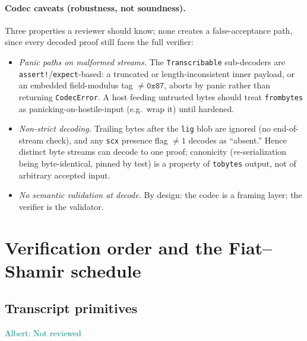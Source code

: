 \documentclass[11pt]{article}
\newcommand{\albert}[1]{\textcolor{teal}{Albert: {#1}}}
\newcommand{\code}[1]{{\def\_{\textunderscore\allowbreak}\texttt{#1}}}
\begin{document}
\paragraph{Codec caveats (robustness, not soundness).}  Three properties
a reviewer should know; none creates a false-acceptance path, since every
decoded proof still faces the full verifier:
\begin{itemize}[itemsep=1pt]
\item \emph{Panic paths on malformed streams.}  The \code{Transcribable}
  sub-decoders are \code{assert!}/\code{expect}-based: a truncated or
  length-inconsistent inner payload, or an embedded field-modulus tag
  $\ne \mathtt{0x87}$, aborts by panic rather than returning
  \code{CodecError}.  A host feeding untrusted bytes should treat
  \code{from\_bytes} as panicking-on-hostile-input (e.g.\ wrap it) until
  hardened.
\item \emph{Non-strict decoding.}  Trailing bytes after the
  \code{lig} blob are ignored (no end-of-stream check), and any
  \code{sc\_x} presence flag $\ne 1$ decodes as ``absent.''  Hence
  distinct byte streams can decode to one proof; canonicity
  (\emph{re}-serialization being byte-identical, pinned by test) is a
  property of \code{to\_bytes} output, not of arbitrary accepted input.
\item \emph{No semantic validation at decode.}  By design: the codec is a
  framing layer; the verifier is the validator.
\end{itemize}

\section{Verification order and the Fiat--Shamir schedule}
\label{sec:schedule}

\subsection{Transcript primitives}
\label{sec:transcript}
\albert{Not reviewed}
\end{document}
